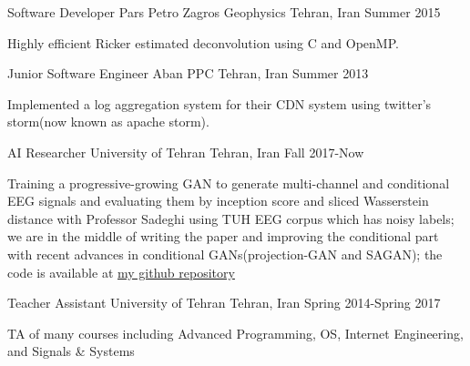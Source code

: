 \begin{cventries}
  \cventry
    {Software Developer} %
    {Pars Petro Zagros Geophysics} %
    {Tehran, Iran} %
    {Summer 2015} %
    {
      \begin{cvitems} %
        \item {Highly efficient Ricker estimated deconvolution using C and OpenMP.}
      \end{cvitems}
    }

  \cventry
    {Junior Software Engineer} %
    {Aban PPC} %
    {Tehran, Iran} %
    {Summer 2013} %
    {
      \begin{cvitems} %
        \item {Implemented a log aggregation system for their CDN system using twitter's storm(now known as apache storm).}
      \end{cvitems}
    }

\end{cventries}



\begin{cventries}

 \cventry
    {AI Researcher} %
    {University of Tehran} %
    {Tehran, Iran} %
    {Fall 2017-Now} %
    {
      \begin{cvitems} %
      	\item {Training a progressive-growing GAN to generate multi-channel and conditional EEG signals and evaluating them by inception score and sliced Wasserstein distance with Professor Sadeghi using TUH EEG corpus which has noisy labels; we are in the middle of writing the paper and improving the conditional part with recent advances in conditional GANs(projection-GAN and SAGAN); the code is available at \href{https://github.com/Separius/EEG-GAN}{my github repository}}
      \end{cvitems}
    }

 \cventry
    {Teacher Assistant} %
    {University of Tehran} %
    {Tehran, Iran} %
    {Spring 2014-Spring 2017} %
    {
      \begin{cvitems} %
        \item {TA of many courses including Advanced Programming, OS, Internet Engineering, and Signals \& Systems}
      \end{cvitems}
    }
\end{cventries}
